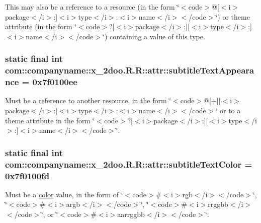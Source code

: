 This may also be a reference to a resource (in the form \char`\"{}$<$code$>$@\mbox{[}$<$i$>$package$<$/i$>$:\mbox{]}$<$i$>$type$<$/i$>$:$<$i$>$name$<$/i$>$$<$/code$>$\char`\"{}) or theme attribute (in the form \char`\"{}$<$code$>$?\mbox{[}$<$i$>$package$<$/i$>$:\mbox{]}\mbox{[}$<$i$>$type$<$/i$>$:\mbox{]}$<$i$>$name$<$/i$>$$<$/code$>$\char`\"{}) containing a value of this type. \hypertarget{classcom_1_1companyname_1_1x__2doo_1_1_r_1_1attr_1d6b31814d297da4d7d18412e2d6fc15}{
\subsubsection[{subtitleTextAppearance}]{\setlength{\rightskip}{0pt plus 5cm}static final int com::companyname::x\_\-2doo.R.R::attr::subtitleTextAppearance = 0x7f0100ee}}
\label{classcom_1_1companyname_1_1x__2doo_1_1_r_1_1attr_1d6b31814d297da4d7d18412e2d6fc15}


Must be a reference to another resource, in the form \char`\"{}$<$code$>$@\mbox{[}+\mbox{]}\mbox{[}$<$i$>$package$<$/i$>$:\mbox{]}$<$i$>$type$<$/i$>$:$<$i$>$name$<$/i$>$$<$/code$>$\char`\"{} or to a theme attribute in the form \char`\"{}$<$code$>$?\mbox{[}$<$i$>$package$<$/i$>$:\mbox{]}\mbox{[}$<$i$>$type$<$/i$>$:\mbox{]}$<$i$>$name$<$/i$>$$<$/code$>$\char`\"{}. \hypertarget{classcom_1_1companyname_1_1x__2doo_1_1_r_1_1attr_3d8f65819b4bb9a277d31175502b989f}{
\subsubsection[{subtitleTextColor}]{\setlength{\rightskip}{0pt plus 5cm}static final int com::companyname::x\_\-2doo.R.R::attr::subtitleTextColor = 0x7f0100fd}}
\label{classcom_1_1companyname_1_1x__2doo_1_1_r_1_1attr_3d8f65819b4bb9a277d31175502b989f}


Must be a \hyperlink{classcom_1_1companyname_1_1x__2doo_1_1_r_1_1color}{color} value, in the form of \char`\"{}$<$code$>$\#$<$i$>$rgb$<$/i$>$$<$/code$>$\char`\"{}, \char`\"{}$<$code$>$\#$<$i$>$argb$<$/i$>$$<$/code$>$\char`\"{}, \char`\"{}$<$code$>$\#$<$i$>$rrggbb$<$/i$>$$<$/code$>$\char`\"{}, or \char`\"{}$<$code$>$\#$<$i$>$aarrggbb$<$/i$>$$<$/code$>$\char`\"{}. 

